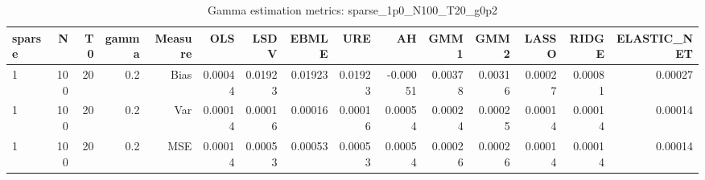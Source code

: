 \begin{table}[!htbp]\centering
\caption{Gamma estimation metrics: sparse_1p0_N100_T20_g0p2}
\label{tab:table1_sparse_1p0_N100_T20_g0p2}
\begin{tabular}{lrrrrrrrrrrrrrr}
\hline
sparse & N & T0 & gamma & Measure & OLS & LSDV & EBMLE & URE & AH & GMM1 & GMM2 & LASSO & RIDGE & ELASTIC_NET \\
\hline
1 & 100 & 20 & 0.2 & Bias & 0.00044 & 0.01923 & 0.01923 & 0.01923 & -0.00051 & 0.00378 & 0.00316 & 0.00027 & 0.00081 & 0.00027 \\
1 & 100 & 20 & 0.2 & Var & 0.00014 & 0.00016 & 0.00016 & 0.00016 & 0.00054 & 0.00024 & 0.00025 & 0.00014 & 0.00014 & 0.00014 \\
1 & 100 & 20 & 0.2 & MSE & 0.00014 & 0.00053 & 0.00053 & 0.00053 & 0.00054 & 0.00026 & 0.00026 & 0.00014 & 0.00014 & 0.00014 \\
\hline
\end{tabular}
\end{table}

